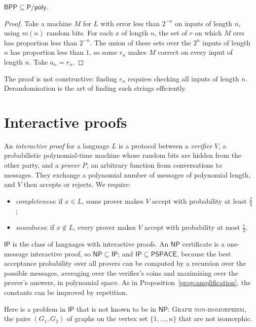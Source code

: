 \begin{theorem}[Adleman 1978]\label{thm:adleman}
$\mathsf{BPP}\subseteq\mathsf P/\mathsf{poly}$.
\end{theorem}

\begin{proof}
Take a machine $M$ for $L$ with error less than $2^{-n}$ on inputs of length $n$, using $m(n)$ random bits. For each $x$ of length $n$, the set of $r$ on which $M$ errs has proportion less than $2^{-n}$. The union of these sets over the $2^n$ inputs of length $n$ has proportion less than $1$, so some $r_n$ makes $M$ correct on every input of length $n$. Take $a_n=r_n$.
\end{proof}

The proof is not constructive: finding $r_n$ requires checking all inputs of length $n$. Derandomisation is the art of finding such strings efficiently.

\section{Interactive proofs}\label{sec:ip}

An \emph{interactive proof} for a language $L$ is a protocol between a \emph{verifier} $V$, a probabilistic polynomial-time machine whose random bits are hidden from the other party, and a \emph{prover} $P$, an arbitrary function from conversations to messages. They exchange a polynomial number of messages of polynomial length, and $V$ then accepts or rejects. We require:
\begin{itemize}
\item \emph{completeness}: if $x\in L$, some prover makes $V$ accept with probability at least $\frac23$;
\item \emph{soundness}: if $x\notin L$, every prover makes $V$ accept with probability at most $\frac13$.
\end{itemize}
$\mathsf{IP}$ is the class of languages with interactive proofs. An $\mathsf{NP}$ certificate is a one-message interactive proof, so $\mathsf{NP}\subseteq\mathsf{IP}$; and $\mathsf{IP}\subseteq\mathsf{PSPACE}$, because the best acceptance probability over all provers can be computed by a recursion over the possible messages, averaging over the verifier's coins and maximising over the prover's answers, in polynomial space. As in Proposition~\ref{prop:amplification}, the constants can be improved by repetition.

Here is a problem in $\mathsf{IP}$ that is not known to be in $\mathsf{NP}$: \textup{\textsc{Graph non-isomorphism}}, the pairs $(G_1,G_2)$ of graphs on the vertex set $\{1,\dots,n\}$ that are not isomorphic.

